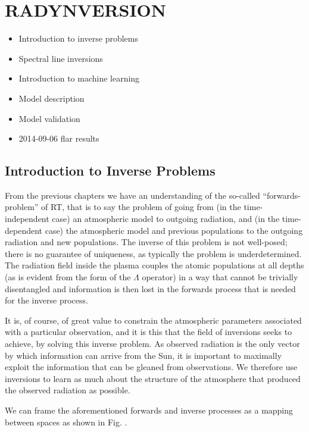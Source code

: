 \chapter{RADYNVERSION}\label{Chap:Radynversion}

\begin{itemize}
    \item Introduction to inverse problems
    \item Spectral line inversions
    \item Introduction to machine learning
    \item Model description
    \item Model validation
    \item 2014-09-06 flar results
\end{itemize}

\section{Introduction to Inverse Problems}

From the previous chapters we have an understanding of the so-called ``forwards-problem'' of RT, that is to say the problem of going from (in the time-independent case) an atmospheric model to outgoing radiation, and (in the time-dependent case) the atmospheric model and previous populations to the outgoing radiation and new populations.
The inverse of this problem is not well-posed; there is no guarantee of uniqueness, as typically the problem is underdetermined.
The radiation field inside the plasma couples the atomic populations at all depths (as is evident from the form of the $\Lambda$ operator) in a way that cannot be trivially disentangled and information is then lost in the forwards process that is needed for the inverse process.

It is, of course, of great value to constrain the atmospheric parameters associated with a particular observation, and it is this that the field of inversions seeks to achieve, by solving this inverse problem. As observed radiation is the only vector by which information can arrive from the Sun, it is important to maximally exploit the information that can be gleaned from observations. We therefore use inversions to learn as much about the structure of the atmosphere that produced the observed radiation as possible.

We can frame the aforementioned forwards and inverse processes as a mapping between spaces as shown in Fig. \NeedRef{}.

